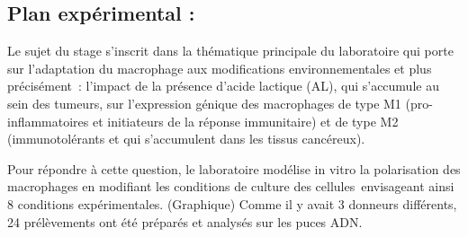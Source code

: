 \documentclass[a4paper,10pt]{article}
\begin{document}
\subsection{ Plan expérimental :}
Le sujet du stage s’inscrit dans la thématique principale du laboratoire qui porte sur l’adaptation du macrophage aux modifications environnementales et plus précisément : l’impact de la présence d’acide lactique (AL), qui s’accumule au sein des tumeurs, sur l’expression génique des macrophages de type M1 (pro-inflammatoires et initiateurs de la réponse immunitaire) et de type M2 (immunotolérants et qui s’accumulent dans les tissus cancéreux).

Pour répondre à cette question, le laboratoire modélise in vitro la polarisation des macrophages en modifiant les conditions de culture des cellules envisageant ainsi 8 conditions expérimentales. (Graphique) Comme il y avait 3 donneurs différents, 24 prélèvements ont été préparés et analysés sur les puces ADN.
\end{document}

